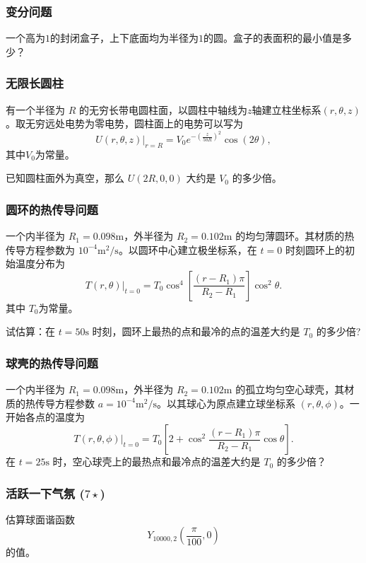 \documentclass[CJK]{beamer}
\date{}
\begin{document}
  \bch
{}

\begin{frame}
  \frametitle{变分问题}
  一个高为$1$的封闭盒子，上下底面均为半径为$1$的圆。盒子的表面积的最小值是多少？
\end{frame}

\begin{frame}
  \frametitle{无限长圆柱}
有一个半径为 $R$ 的无穷长带电圆柱面，以圆柱中轴线为$z$轴建立柱坐标系$(r,\theta,z)$。取无穷远处电势为零电势，圆柱面上的电势可以写为
$$U(r,\theta,z)\vert_{r=R} = V_0e^{-\left(\frac{z}{50R}\right)^2}\cos(2\theta) , $$
其中$V_0$为常量。

已知圆柱面外为真空，那么 $U(2R,0,0)$ 大约是 $V_0$ 的多少倍。
\end{frame}

\begin{frame}
  \frametitle{圆环的热传导问题}
  
 一个内半径为 $R_1=0.098\mathrm{m}$，外半径为 $R_2=0.102\mathrm{m}$ 的均匀薄圆环。其材质的热传导方程参数为 $10^{-4}\mathrm{m^2/s}$。以圆环中心建立极坐标系，在 $t=0$ 时刻圆环上的初始温度分布为 
$$\left. T(r,\theta)\right\vert_{t=0}=T_0\cos^4\left[\frac{(r-R_1)\pi}{R_2-R_1}\right]\cos^2\theta.$$
 其中 $T_0$为常量。
 
试估算：在 $t=50\mathrm{s}$ 时刻，圆环上最热的点和最冷的点的温差大约是 $T_0$ 的多少倍?
\end{frame}

\begin{frame}
  \frametitle{球壳的热传导问题}
  一个内半径为 $R_1=0.098\mathrm{m}$，外半径为 $R_2=0.102\mathrm{m}$ 的孤立均匀空心球壳，其材质的热传导方程参数 $a=10^{-4}\mathrm{m^2/s}$。以其球心为原点建立球坐标系 $(r,\theta,\phi)$。一开始各点的温度为
$$ \left.T(r,\theta,\phi)\right\vert_{t=0} = T_0\left[2+\cos^2\frac{(r-R_1)\pi}{R_2-R_1}\cos\theta\right].$$
在 $t=25\mathrm{s}$ 时，空心球壳上的最热点和最冷点的温差大约是 $T_0$ 的多少倍？
\end{frame}

\begin{frame}
\frametitle{活跃一下气氛 ($7\star$)}
估算球面谐函数
$$Y_{10000,2}\left(\frac{\pi}{100}, 0\right)$$
的值。
\end{frame}

\ech
\end{document}
